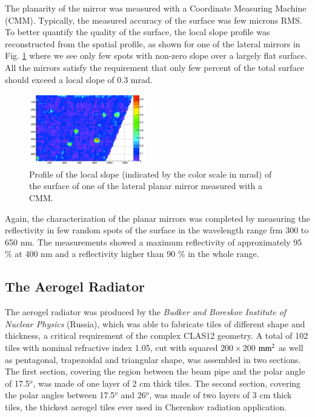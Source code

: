 \documentclass[5p,times,twocolumn]{elsarticle}
\begin{document}
The planarity of the mirror was measured with a Coordinate Measuring Machine (CMM).
Typically, the measured accuracy of the surface was few microns RMS.
To better quantify the quality of the surface, the local slope profile was reconstructed from the spatial profile, as shown for one of the lateral mirrors in Fig. \ref{Fig:SlopeML}  where we see only few spots with non-zero slope over a largely flat surface.
All the mirrors satisfy the requirement that only few percent of the total surface should exceed a local slope of 0.3 mrad.

\begin{figure}
\begin{center}
\includegraphics[width=0.45\textwidth]{SlopeML.pdf}
\caption{Profile of the local slope (indicated by the color scale in mrad) of the surface of one of the lateral planar mirror measured with a CMM.}
\label{Fig:SlopeML}
\end{center}
\end{figure}

Again, the characterization of the planar mirrors was completed by measuring the reflectivity in few random spots of the surface in the wavelength range frm 300 to 650 nm.
The measurements showed a maximum reflectivity of approximately 95 \% at 400 nm and a reflectivity higher than 90 \% in the whole range.

\subsection{The Aerogel Radiator}

The aerogel radiator was produced by the {\it Budker and Boreskov Institute of Nuclear Physics} (Russia), which was able to fabricate tiles of different shape and thickness, a critical requirement of the complex CLAS12 geometry.
A total of 102 tiles with nominal refractive index 1.05, cut with squared $200 \times 200$ $\rm mm^2$ as well as pentagonal, trapezoidal and triangular shape, was assembled in two sections.
The first section, covering the region between the beam pipe and the polar angle of 17.5$^o$, was made of one layer of 2 cm thick tiles.
The second section, covering the polar angles between 17.5$^o$ and 26$^o$, was made of two layers of 3 cm thick tiles, the thickest aerogel tiles ever used in Cherenkov radiation application.
\end{document}
